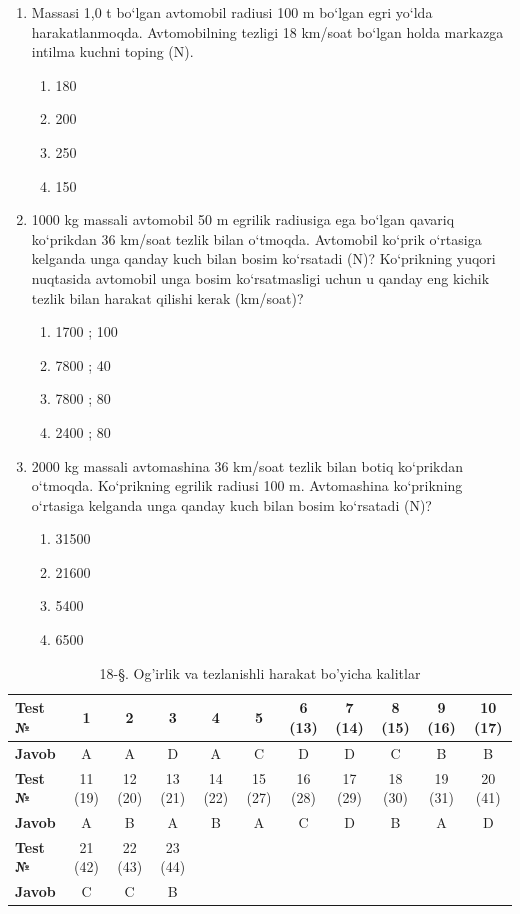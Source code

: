 \begin{enumerate}
\item Massasi 1,0 t bo‘lgan avtomobil radiusi 100 m bo‘lgan egri yo‘lda harakatlanmoqda. Avtomobilning tezligi 18 km/soat bo‘lgan holda markazga intilma kuchni toping (N).
\begin{enumerate}[label=\Alph*)]
\item 180
\item 200
\item 250
\item 150
\end{enumerate}

\item 1000 kg massali avtomobil 50 m egrilik radiusiga ega bo‘lgan qavariq ko‘prikdan 36 km/soat tezlik bilan o‘tmoqda. Avtomobil ko‘prik o‘rtasiga kelganda unga qanday kuch bilan bosim ko‘rsatadi (N)? Ko‘prikning yuqori nuqtasida avtomobil unga bosim ko‘rsatmasligi uchun u qanday eng kichik tezlik bilan harakat qilishi kerak (km/soat)?
\begin{enumerate}[label=\Alph*)]
\item 1700 ; 100
\item 7800 ; 40
\item 7800 ; 80
\item 2400 ; 80
\end{enumerate}

\item 2000 kg massali avtomashina 36 km/soat tezlik bilan botiq ko‘prikdan o‘tmoqda. Ko‘prikning egrilik radiusi 100 m. Avtomashina ko‘prikning o‘rtasiga kelganda unga qanday kuch bilan bosim ko‘rsatadi (N)?
\begin{enumerate}[label=\Alph*)]
\item 31500
\item 21600
\item 5400
\item 6500
\end{enumerate}

\end{enumerate}


\begin{table}[h!]
\centering
\caption{18-\S. Og'irlik va tezlanishli harakat bo'yicha kalitlar}
\begin{tabular}{|l|c|c|c|c|c|c|c|c|c|c|}
\hline
\textbf{Test №} & 1 & 2 & 3 & 4 & 5 & 6 (13) & 7 (14) & 8 (15) & 9 (16) & 10 (17) \\ \hline
\textbf{Javob}  & A & A & D & A & C & D & D & C & B & B \\ \hline
\hline
\textbf{Test №} & 11 (19) & 12 (20) & 13 (21) & 14 (22) & 15 (27) & 16 (28) & 17 (29) & 18 (30) & 19 (31) & 20 (41) \\ \hline
\textbf{Javob}  & A & B & A & B & A & C & D & B & A & D \\ \hline
\hline
\textbf{Test №} & 21 (42) & 22 (43) & 23 (44) & & & & & & & \\ \hline
\textbf{Javob}  & C & C & B & & & & & & & \\ \hline
\end{tabular}
\end{table}